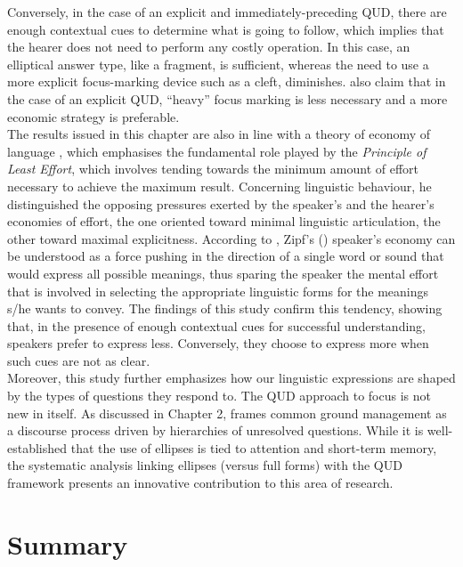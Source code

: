 Conversely, in the case of an explicit and immediately-preceding QUD, there are enough contextual cues to determine what is going to follow, which implies that the hearer does not need to perform any costly operation. In this case, an elliptical answer type, like a fragment, is sufficient, whereas the need to use a more explicit focus-marking device such as a cleft, diminishes. \textcite{zimmermann2011focus} also claim that in the case of an explicit QUD, ``heavy” focus marking is less necessary and a more economic strategy is preferable.\\
The results issued in this chapter are also in line with a theory of economy of language \parencite{zipf1949human}, which emphasises the fundamental role played by the \textit{Principle of Least Effort}, which involves tending towards the minimum amount of effort necessary to achieve the maximum result.  Concerning linguistic behaviour, he distinguished the opposing pressures exerted by the speaker’s and the hearer’s economies of effort, the one oriented toward minimal linguistic articulation, the other toward maximal explicitness.
According to \textcite{carston2005note}, Zipf’s (\citeyear{zipf1949human}) speaker’s economy can be understood as a force pushing in the direction of a single word or sound that would express all possible meanings, thus sparing the speaker the mental effort that is involved in selecting the appropriate linguistic forms for the meanings s/he wants to convey.
The findings of this study confirm this tendency, showing that, in the presence of enough contextual cues for successful understanding, speakers prefer to express less. Conversely, they choose to express more when such cues are not as clear. \\
Moreover, this study further emphasizes how our linguistic expressions are shaped by the types of questions they respond to. The QUD approach to focus is not new in itself. As discussed in Chapter 2, \textcite{roberts1996information} frames common ground management as a discourse process driven by hierarchies of unresolved questions. While it is well-established that the use of ellipses is tied to attention and short-term memory, the systematic analysis linking ellipses (versus full forms) with the QUD framework presents an innovative contribution to this area of research.

\section{Summary}

